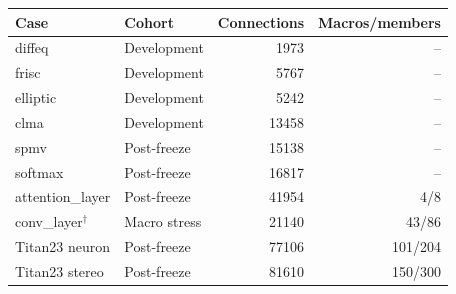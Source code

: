 \begin{tabular}{llrr}
\toprule
Case & Cohort & Connections & Macros/members \\
\midrule
diffeq & Development & 1973 & -- \\
frisc & Development & 5767 & -- \\
elliptic & Development & 5242 & -- \\
clma & Development & 13458 & -- \\
spmv & Post-freeze & 15138 & -- \\
softmax & Post-freeze & 16817 & -- \\
attention\_layer & Post-freeze & 41954 & 4/8 \\
conv\_layer$^{\dagger}$ & Macro stress & 21140 & 43/86 \\
Titan23 neuron & Post-freeze & 77106 & 101/204 \\
Titan23 stereo & Post-freeze & 81610 & 150/300 \\
\bottomrule
\end{tabular}
